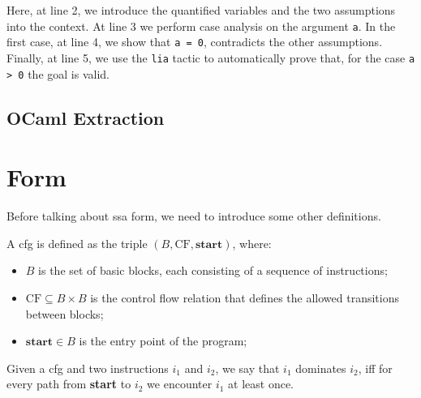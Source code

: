 Here, at line 2, we introduce the quantified variables and the two assumptions into the context. At line 3 we perform case analysis on the argument \texttt a. In the first case, at line 4, we show that \texttt{a = 0}, contradicts the other assumptions. Finally, at line 5, we use the \texttt{lia} tactic to automatically prove that, for the case \texttt{a > 0} the goal is valid.

\subsection{OCaml Extraction}
\label{subsec:extract}

\section{ Form}
\label{sec:ssa}


Before talking about \gls{ssa} form, we need to introduce some other definitions.

\begin{definition}
  A \gls{cfg} is defined as the triple $(B, \text{CF}, \textbf{start})$, where:
  \begin{itemize}
    \item $B$ is the set of basic blocks, each consisting of a sequence of instructions;
    \item $\text{CF} \subseteq B \times B$ is the control flow relation that defines the allowed transitions between blocks;
    \item $\textbf{start} \in B$ is the entry point of the program;
  \end{itemize}
\end{definition}

\begin{definition}[Dominance]
  Given a \gls{cfg} and two instructions $i_1$ and $i_2$, we say that $i_1$ dominates $i_2$, iff for every path from \textbf{start} to $i_2$ we encounter $i_1$ at least once.
\end{definition}

